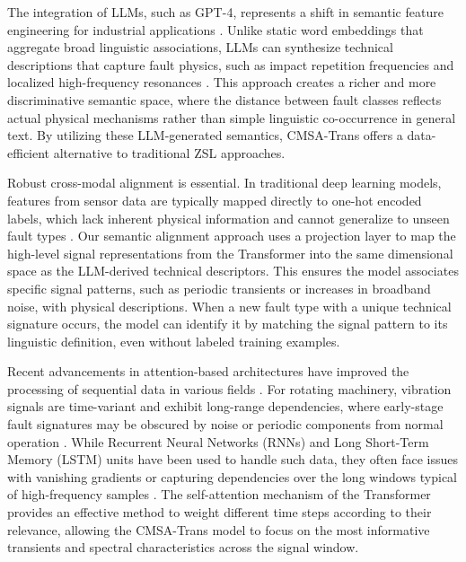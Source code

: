 \documentclass[journal]{IEEEtran}
\begin{document}
The integration of LLMs, such as GPT-4, represents a shift in semantic feature engineering for industrial applications \cite{bubeck2023sparks}. Unlike static word embeddings that aggregate broad linguistic associations, LLMs can synthesize technical descriptions that capture fault physics, such as impact repetition frequencies and localized high-frequency resonances \cite{brown2020language}. This approach creates a richer and more discriminative semantic space, where the distance between fault classes reflects actual physical mechanisms rather than simple linguistic co-occurrence in general text. By utilizing these LLM-generated semantics, CMSA-Trans offers a data-efficient alternative to traditional ZSL approaches.

Robust cross-modal alignment is essential. In traditional deep learning models, features from sensor data are typically mapped directly to one-hot encoded labels, which lack inherent physical information and cannot generalize to unseen fault types \cite{goodfellow2016deep, lecun2015deep}. Our semantic alignment approach uses a projection layer to map the high-level signal representations from the Transformer into the same dimensional space as the LLM-derived technical descriptors. This ensures the model associates specific signal patterns, such as periodic transients or increases in broadband noise, with physical descriptions. When a new fault type with a unique technical signature occurs, the model can identify it by matching the signal pattern to its linguistic definition, even without labeled training examples.

Recent advancements in attention-based architectures have improved the processing of sequential data in various fields \cite{devlin2018bert, dosovitskiy2020image}. For rotating machinery, vibration signals are time-variant and exhibit long-range dependencies, where early-stage fault signatures may be obscured by noise or periodic components from normal operation \cite{zhang2021attention}. While Recurrent Neural Networks (RNNs) and Long Short-Term Memory (LSTM) units have been used to handle such data, they often face issues with vanishing gradients or capturing dependencies over the long windows typical of high-frequency samples \cite{hochreiter1997long}. The self-attention mechanism of the Transformer provides an effective method to weight different time steps according to their relevance, allowing the CMSA-Trans model to focus on the most informative transients and spectral characteristics across the signal window.
\end{document}
